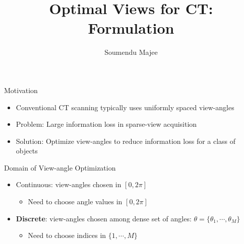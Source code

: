\documentclass[english,aspectratio=43]{beamer}
\title{Optimal Views for CT: Formulation}
\author{Soumendu Majee}
\date{}
\begin{document}
\begin{frame}
    \titlepage
\end{frame}


\begin{frame}{Motivation}
	\begin{itemize}
	    \setlength\itemsep{2em}
		\item Conventional CT scanning typically uses uniformly spaced view-angles
		
		\item Problem: Large information loss in sparse-view acquisition
		
		\item Solution: Optimize view-angles to reduce information loss for a class of objects
		
		
	\end{itemize}
\end{frame}

\begin{frame}{Domain of View-angle Optimization}
	\begin{itemize}
	    \setlength\itemsep{2em}
		\item Continuous: view-angles chosen in $[0, 2\pi]$
		\begin{itemize}
		    \item Need to choose angle values in $[0, 2\pi]$
	    \end{itemize}
		
		\item \textbf{Discrete}: view-angles chosen among dense set of angles: $\theta = \{\theta_1, \cdots, \theta_M \}$
		\begin{itemize}
		    \item Need to choose indices in $\{ 1, \cdots, M \}$
		
	    \end{itemize}
		
		
	\end{itemize}
\end{frame}
\end{document}
